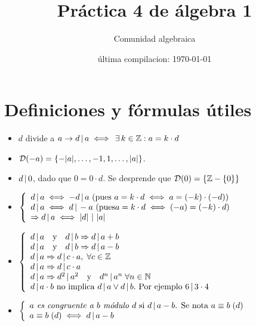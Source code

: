 




\title{Práctica 4 de álgebra 1} %
\author{Comunidad algebraica} %
\date{última compilacion: \today} %

\maketitle  %
\section{Definiciones y fórmulas útiles}

\begin{itemize}
	\item $d$ divide a $a \to d \divideA a \sisolosi \existe k \in \enteros : a = k \cdot d$
	\item $ \divset{-a}{-|a|,\dots,-1,1,\dots,|a|}$.
	\item $d \divideA 0 $, dado que $0 = 0\cdot d$. Se desprende que $\divset{0}{\enteros - \set{0}}$
	\item $\llave{l}{
			      d \divideA a \sisolosi -d \divideA a \text{ (pues }a = k \cdot d \sisolosi a = (-k) \cdot (-d))\\
			      d \divideA a \sisolosi d \divideA -a \text{ (pues} a = k \cdot d \sisolosi (-a) = (-k) \cdot d)\\
			      \entonces d \divideA a \sisolosi |d| \,\divideA\, |a|
		      }$

	\item $\llave{l}{
			      d \divideA a \ytext d \divideA b \entonces d \divideA a + b\\
			      d \divideA a \ytext d \divideA b \entonces d \divideA a - b\\
			      d \divideA a \entonces d \divideA c \cdot a, \paratodo c \en \enteros\\
			      d \divideA a \entonces d \divideA c \cdot a\\
			      d \divideA a \entonces d^2 \divideA a^2 \ytext d^n \divideA a^n  \paratodo n \en \naturales\\
			      d \divideA a \cdot b \text{ no implica } d \divideA a \o d \divideA b. \text{ Por ejemplo } 6 \divideA 3 \cdot 4
		      }$

	\item
	      $\llave{l}{
			      \textit{$a$ es congruente a $b$ módulo $d$} \text{ si }   d \divideA a-b \text{. Se nota } \congruencia{a}{b}{d}\\
			      \congruencia{a}{b}{d} \sisolosi d \divideA a-b
		      }$


\end{itemize}

